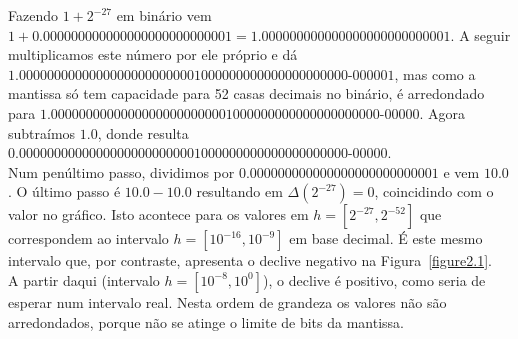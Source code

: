 \documentclass[aps,pre,twocolumn,showpacs,amsmath,amssymb]{revtex4-1}
\begin{document}
Fazendo $1+2^{-27}$ em binário vem $1+0.000000000000000000000000001=1.000000000000000000000000001$. A seguir multiplicamos este número por ele próprio e dá $1.00000000000000000000000001000000000000000000000$-$000001$, mas como a mantissa só tem capacidade para 52 casas decimais no binário, é arredondado para $1.00000000000000000000000001000000000000000000000$-$00000$.
Agora subtraímos $1.0$, donde resulta $0.00000000000000000000000001000000000000000000000$-$00000$.\\Num penúltimo passo, dividimos por $0.000000000000000000000000001$ e vem $10.0$.
O último passo é $10.0-10.0$ resultando em $\Delta(2^{-27})=0$, coincidindo com o valor no gráfico.
Isto acontece para os valores em $h=[2^{-27},2^{-52}]$ que correspondem ao intervalo $h=[10^{-16},10^{-9}]$ em base decimal. É este mesmo intervalo que, por contraste, apresenta o declive negativo na Figura~\ref{figure2.1}.\\
A partir daqui (intervalo $h=[10^{-8},10^{0}]$), o declive é positivo, como seria de esperar num intervalo real. Nesta ordem de grandeza os valores não são arredondados, porque não se atinge o limite de bits da mantissa.
\end{document}
